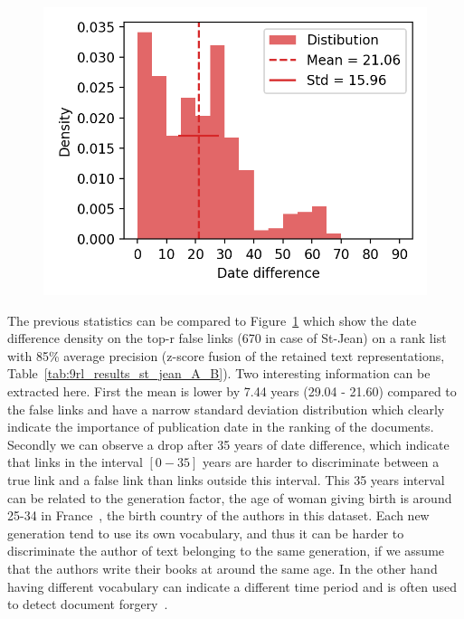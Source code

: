 \begin{figure}
  \label{fig:dates_differences_r_false}
  \includegraphics[width=\linewidth]{img/dates_differences_r_false.png}
\end{figure}

The previous statistics can be compared to Figure~\ref{fig:dates_differences_r_false} which show the date difference density on the top-r false links (670 in case of St-Jean) on a rank list with 85\% average precision (z-score fusion of the retained text representations, Table~\ref{tab:9rl_results_st_jean_A_B}).
Two interesting information can be extracted here.
First the mean is lower by 7.44 years (29.04 - 21.60) compared to the false links and have a narrow standard deviation distribution which clearly indicate the importance of publication date in the ranking of the documents.
Secondly we can observe a drop after 35 years of date difference, which indicate that links in the interval $\left[0-35\right]$ years are harder to discriminate between a true link and a false link than links outside this interval.
This 35 years interval can be related to the generation factor, the age of woman giving birth is around 25-34 in France~\cite{generations}, the birth country of the authors in this dataset.
Each new generation tend to use its own vocabulary, and thus it can be harder to discriminate the author of text belonging to the same generation, if we assume that the authors write their books at around the same age.
In the other hand having different vocabulary can indicate a different time period and is often used to detect document forgery~\cite{savoy_stylo}.
